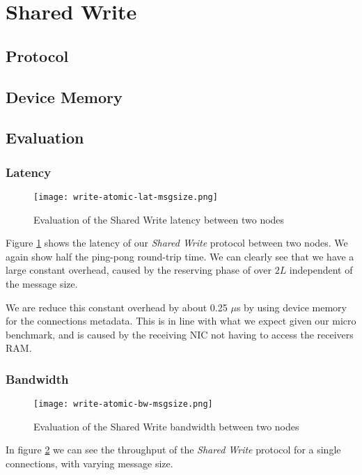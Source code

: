\section{Shared Write}
\subsection{Protocol}
\subsection{Device Memory}
\subsection{Evaluation}

\subsubsection{Latency}

\begin{figure}[h]
\texttt{[image: write-atomic-lat-msgsize.png]}
\caption{Evaluation of the Shared Write latency between two nodes}
\label{fig:plot-write-atomic-lat}
\end{figure}

Figure \ref{fig:plot-write-atomic-lat} shows the latency of our \emph{Shared Write} protocol between two nodes. 
We again show half the ping-pong round-trip time. We can clearly see that we have a large constant overhead, caused
by the reserving phase of over $2L$ independent of the message size.

We are reduce this constant overhead by about 0.25 $\mu$s by using device memory for the connections metadata. This is 
in line with what we expect given our micro benchmark, and is caused by the receiving NIC not having to access the 
receivers RAM.


\subsubsection{Bandwidth}

\begin{figure}[h]
\texttt{[image: write-atomic-bw-msgsize.png]}
\caption{Evaluation of the Shared Write bandwidth between two nodes}
\label{fig:plot-write-atomic-bw}
\end{figure}

In figure \ref{fig:plot-write-atomic-bw} we can see the throughput of the \emph{Shared Write} protocol for a single 
connections, with varying message size. 

